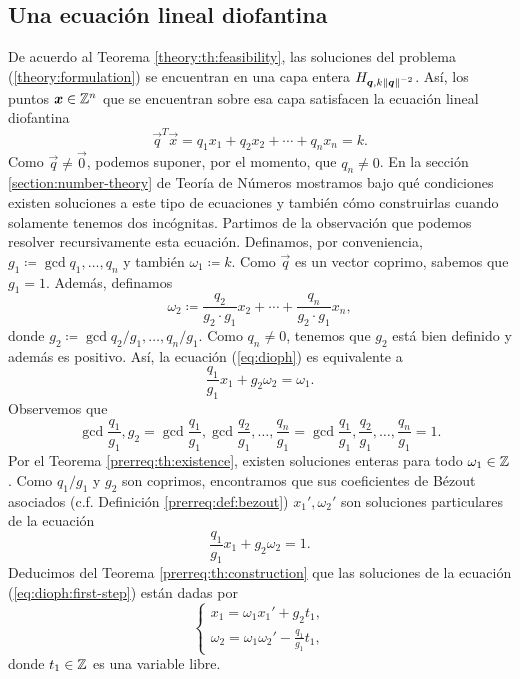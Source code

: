 \subsection{Una ecuación lineal diofantina}
\label{subsec:dioph-eq}
\noindent
De acuerdo al Teorema \ref{theory:th:feasibility}, las soluciones del problema
(\ref{theory:formulation}) se encuentran en una capa entera $H_{\boldsymbol{q}, k\left\lVert \boldsymbol{q} \right\rVert^{-2}}$.
Así, los puntos $\boldsymbol{x} \in \mathbb{Z}^n$ que se encuentran sobre esa capa satisfacen la ecuación lineal
diofantina
\begin{equation}
	\label{eq:dioph}
	\vec{q}^T\vec{x} = q_1x_1 + q_2x_2 + \cdots + q_nx_n = k.
\end{equation}
Como $\vec{q} \neq \vec{0}$, podemos suponer, por el momento, que $q_n \neq 0$. En la sección
\ref{section:number-theory} de Teoría de Números mostramos bajo qué condiciones existen soluciones a
este tipo de ecuaciones y también cómo construirlas cuando solamente tenemos dos incógnitas.
Partimos de la observación que podemos resolver recursivamente esta ecuación. Definamos, por
conveniencia, $g_1 \coloneq \gcd{q_1, \ldots, q_n}$ y también $\omega_1 \coloneq k$. Como $\vec{q}$
es un vector coprimo, sabemos que $g_1 = 1$. Además, definamos
\begin{equation*}
	\omega_2 \coloneq \frac{q_2}{g_2 \cdot g_1}x_2 + \cdots + \frac{q_n}{g_2 \cdot
	g_1}x_n,
\end{equation*}
donde $g_2 \coloneq \gcd{q_2/g_1, \ldots, q_n/g_1}$. Como $q_n \neq 0$, tenemos que $g_2$ está bien
definido y además es positivo. Así, la ecuación (\ref{eq:dioph}) es equivalente a
\begin{equation}
	\label{eq:dioph:first-step}
	\frac{q_1}{g_1}x_1 + g_2\omega_2 = \omega_1.
\end{equation}
Observemos que
\begin{equation*}
	\gcd{\frac{q_1}{g_1}, g_2}
	= \gcd{\frac{q_1}{g_1}, \gcd{\frac{q_2}{g_1}, \ldots, \frac{q_n}{g_1}}}
	= \gcd{\frac{q_1}{g_1}, \frac{q_2}{g_1}, \ldots, \frac{q_n}{g_1}} = 1.
\end{equation*}
Por el Teorema \ref{prerreq:th:existence}, existen soluciones enteras para todo $\omega_1 \in \mathbb{Z}$.
Como $q_1/g_1$ y $g_2$ son coprimos, encontramos que sus coeficientes de Bézout asociados (c.f.
Definición \ref{prerreq:def:bezout}) $x_1', \omega_2'$ son soluciones particulares de la ecuación
\begin{equation*}
	\frac{q_1}{g_1}x_1 + g_2\omega_2 = 1.
\end{equation*}
Deducimos del Teorema \ref{prerreq:th:construction} que las soluciones de la ecuación
(\ref{eq:dioph:first-step}) están dadas por
\begin{equation}
	\label{dummy:eq:first-step}
	\begin{cases}
		x_1 = \omega_1x_1' + g_2t_1, \\
		\omega_2 = \omega_1\omega_2' - \frac{q_1}{g_1}t_1,
	\end{cases}
\end{equation}
donde $t_1 \in \mathbb{Z}$ es una variable libre.

